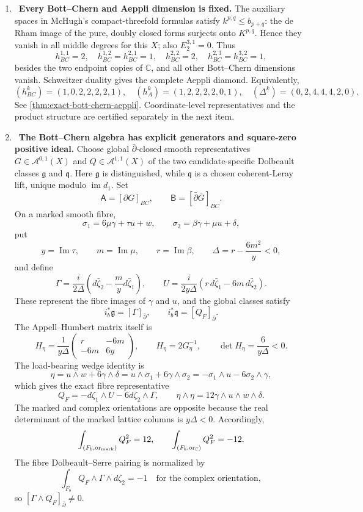\begin{enumerate}[leftmargin=1.8em,itemsep=.65em]
\item \Verified\ \textbf{Every Bott--Chern and Aeppli dimension is fixed.}
The auxiliary spaces in McHugh's compact-threefold formulas satisfy
$k^{p,q}\le b_{p+q}$: the de Rham image of the pure, doubly closed forms
surjects onto $K^{p,q}$.  Hence they vanish in all middle degrees for this
$X$; also
$E_2^{3,1}=0$.  Thus
\[
h^{1,1}_{BC}=2,\quad h^{1,2}_{BC}=h^{2,1}_{BC}=1,\quad
h^{2,2}_{BC}=2,\quad h^{2,3}_{BC}=h^{3,2}_{BC}=1,
\]
besides the two endpoint copies of $\mathbb C$, and all other Bott--Chern
dimensions vanish.  Schweitzer duality gives the complete Aeppli diamond.
Equivalently,
\[
(h^k_{BC})=(1,0,2,2,2,2,1),\quad
(h^k_A)=(1,2,2,2,2,0,1),\quad
(\Delta^k)=(0,2,4,4,4,2,0).
\]
See \cref{thm:exact-bott-chern-aeppli}.  Coordinate-level representatives
and the product structure are certified separately in the next item.

\item \Verified\ \textbf{The Bott--Chern algebra has explicit generators
and square-zero positive ideal.}
Choose global $\bar\partial$-closed smooth representatives
$G\in\mathcal A^{0,1}(X)$ and $Q\in\mathcal A^{1,1}(X)$ of the two
candidate-specific Dolbeault classes $\mathfrak g$ and $\mathfrak q$.
Here $\mathfrak g$ is distinguished, while $\mathfrak q$ is a chosen
coherent-Leray lift, unique modulo $\operatorname{im}d_1$.
Set
\[
 \mathsf A=[\partial G]_{BC},\qquad
 \mathsf B=[\bar\partial\bar G]_{BC}.
\]
On a marked smooth fibre,
\[
 \sigma_1=6\mu\gamma+\tau u+w,\qquad
 \sigma_2=\beta\gamma+\mu u+\delta,
\]
put
\[
 y=\operatorname{Im}\tau,\qquad m=\operatorname{Im}\mu,\qquad
 r=\operatorname{Im}\beta,\qquad
 \Delta=r-\frac{6m^2}{y}<0,
\]
and define
\[
 \Gamma=\frac{i}{2\Delta}
 \left(d\bar\zeta_2-\frac{m}{y}d\bar\zeta_1\right),\qquad
 U=\frac{i}{2y\Delta}
 \left(r\,d\bar\zeta_1-6m\,d\bar\zeta_2\right).
\]
These represent the fibre images of \(\gamma\) and \(u\), and the global
classes satisfy
\[
 i_b^*\mathfrak g=[\Gamma]_{\bar\partial},\qquad
 i_b^*\mathfrak q=[Q_F]_{\bar\partial}.
\]
The Appell--Humbert matrix itself is
\[
 H_\eta=\frac1{y\Delta}
 \begin{pmatrix}r&-6m\\-6m&6y\end{pmatrix},
 \qquad H_\eta=2G_\eta^{-1},\qquad
 \det H_\eta=\frac6{y\Delta}<0.
\]
The load-bearing wedge identity is
\[
 \eta=u\wedge w+6\gamma\wedge\delta
 =u\wedge\sigma_1+6\gamma\wedge\sigma_2
 =-\sigma_1\wedge u-6\sigma_2\wedge\gamma,
\]
which gives the exact fibre representative
\[
 Q_F=-d\zeta_1\wedge U-6d\zeta_2\wedge\Gamma,
 \qquad
 \eta\wedge\eta=12\gamma\wedge u\wedge w\wedge\delta.
\]
The marked and complex orientations are opposite because the real
determinant of the marked lattice columns is
$y\Delta<0$.  Accordingly,
\[
 \int_{(F_b,{\rm or}_{\rm mark})}Q_F^2=12,
 \qquad
 \int_{(F_b,{\rm or}_{\mathbb C})}Q_F^2=-12.
\]
The fibre Dolbeault--Serre pairing is normalized by
\[
 \int_{F_b}Q_F\wedge\Gamma\wedge d\zeta_2=-1
 \quad\text{for the complex orientation},
\]
so $[\Gamma\wedge Q_F]_{\bar\partial}\ne0$.


\end{enumerate}
